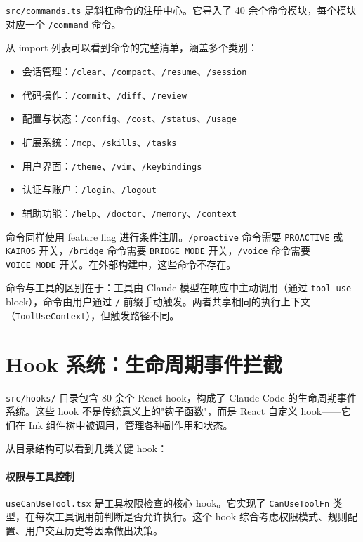 \texttt{src/commands.ts} 是斜杠命令的注册中心。它导入了 40 余个命令模块，每个模块对应一个 \texttt{/command} 命令。

从 import 列表可以看到命令的完整清单，涵盖多个类别：

\begin{itemize}
  \item 会话管理：\texttt{/clear}、\texttt{/compact}、\texttt{/resume}、\texttt{/session}
  \item 代码操作：\texttt{/commit}、\texttt{/diff}、\texttt{/review}
  \item 配置与状态：\texttt{/config}、\texttt{/cost}、\texttt{/status}、\texttt{/usage}
  \item 扩展系统：\texttt{/mcp}、\texttt{/skills}、\texttt{/tasks}
  \item 用户界面：\texttt{/theme}、\texttt{/vim}、\texttt{/keybindings}
  \item 认证与账户：\texttt{/login}、\texttt{/logout}
  \item 辅助功能：\texttt{/help}、\texttt{/doctor}、\texttt{/memory}、\texttt{/context}
\end{itemize}

命令同样使用 feature flag 进行条件注册。\texttt{/proactive} 命令需要 \texttt{PROACTIVE} 或 \texttt{KAIROS} 开关，\texttt{/bridge} 命令需要 \texttt{BRIDGE\_MODE} 开关，\texttt{/voice} 命令需要 \texttt{VOICE\_MODE} 开关。在外部构建中，这些命令不存在。

命令与工具的区别在于：工具由 Claude 模型在响应中主动调用（通过 \texttt{tool\_use} block），命令由用户通过 \texttt{/} 前缀手动触发。两者共享相同的执行上下文（\texttt{ToolUseContext}），但触发路径不同。

\section{Hook 系统：生命周期事件拦截}

\texttt{src/hooks/} 目录包含 80 余个 React hook，构成了 Claude Code 的生命周期事件系统。这些 hook 不是传统意义上的"钩子函数"，而是 React 自定义 hook——它们在 Ink 组件树中被调用，管理各种副作用和状态。

从目录结构可以看到几类关键 hook：

\paragraph{权限与工具控制}

\texttt{useCanUseTool.tsx} 是工具权限检查的核心 hook。它实现了 \texttt{CanUseToolFn} 类型，在每次工具调用前判断是否允许执行。这个 hook 综合考虑权限模式、规则配置、用户交互历史等因素做出决策。

